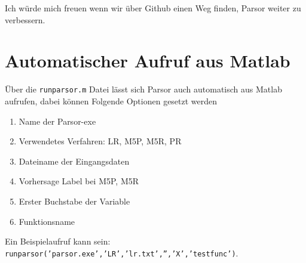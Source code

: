 \documentclass[12pt, a4paper]{scrartcl}
\begin{document}
Ich würde mich freuen wenn wir über Github einen Weg finden, Parsor weiter zu verbessern.

\clearpage
\section{Automatischer Aufruf aus Matlab}

Über die \texttt{runparsor.m} Datei lässt sich Parsor auch automatisch aus Matlab aufrufen, dabei können Folgende Optionen gesetzt werden

\begin{enumerate}
	\item Name der Parsor-exe
	\item Verwendetes Verfahren: LR, M5P, M5R, PR
	\item Dateiname der Eingangsdaten
	\item Vorhersage Label bei M5P, M5R 
	\item Erster Buchstabe der Variable
	\item Funktionsname
\end{enumerate}

Ein Beispielaufruf kann sein: \texttt{runparsor('parsor.exe','LR','lr.txt','','X','testfunc')}.

\clearpage
\renewcommand{\refname}{\section{Links}}


\end{document}
